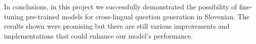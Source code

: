 \documentclass[fleqn,moreauthors,10pt]{ds_report}
\begin{document}
In conclusions, in this project we successfully demonstrated the possibility of fine-tuning pre-trained models for cross-lingual question generation in Slovenian. The results shown were promising but there are still various improvements and implementations that could enhance our model's performance.





\end{document}

